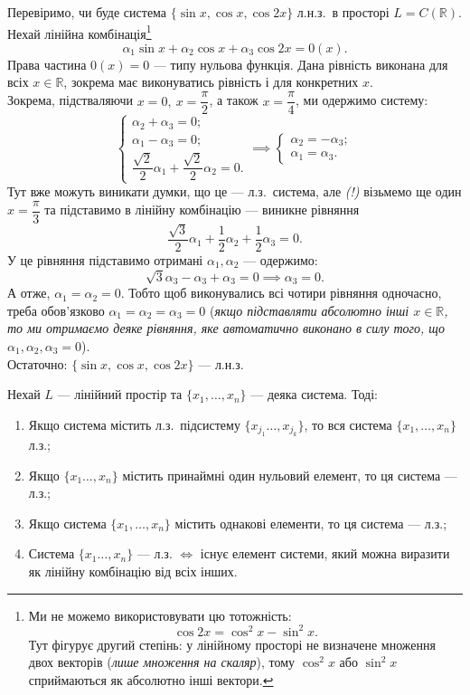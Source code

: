 \documentclass{math_library}
\begin{document}
	\begin{example}
	Перевіримо, чи буде система $\{\sin x, \cos x, \cos 2x\}$ л.н.з.\ в просторі $L = C(\mathbb{R})$.
	\bigskip \\
	Нехай лінійна комбінація\footnote{Ми не можемо використовувати цю тотожність: 
	\[
	\cos 2x = \cos ^2 x - \sin ^2 x.
	\]
	Тут фігурує другий степінь: у лінійному просторі не визначене множення двох векторів (\textit{лише множення на скаляр}), тому $\cos^2 x$ або $\sin^2 x$ сприймаються як абсолютно інші вектори.}
	\[
	\alpha_1 \sin x + \alpha_2 \cos x + \alpha_3 \cos 2x = 0(x).
	\]
	Права частина $0(x) = 0$ --- типу нульова функція. Дана рівність виконана для всіх $x \in \mathbb{R}$, зокрема має виконуватись рівність і для конкретних $x$.\\
	Зокрема, підстваляючи $x = 0,\ x = \dfrac{\pi}{2}$, а також $x = \dfrac{\pi}{4}$, ми одержимо систему:
	\[
	\begin{cases}
	\alpha_2 + \alpha_3 = 0;\\
	\alpha_1 - \alpha_3 = 0;\\
	\dfrac{\sqrt{2}}{2} \alpha_1 + \dfrac{\sqrt{2}}{2} \alpha_2 = 0.
	\end{cases}
	\implies
	\begin{cases}
	\alpha_2 =  -\alpha_3;\\
	\alpha_1 = \alpha_3.
	\end{cases}
	\]
	Тут вже можуть виникати думки, що це --- л.з.\ система, але \textit{(!)} візьмемо ще один $x = \dfrac{\pi}{3}$ та підставимо в лінійну комбінацію --- виникне рівняння
	\[
	\dfrac{\sqrt{3}}{2}\alpha_1 + \dfrac{1}{2}\alpha_2 + \dfrac{1}{2}\alpha_3 = 0.
	\]
	У це рівняння підставимо отримані $\alpha_1,\alpha_2$ --- одержимо:
	\[
	\sqrt{3}\alpha_3 - \alpha_3 + \alpha_3 = 0 \implies \alpha_3 = 0.
	\]
	А отже, $\alpha_1 = \alpha_2 = 0$. Тобто щоб виконувались всі чотири рівняння одночасно, треба обов'язково $\alpha_1 = \alpha_2 = \alpha_3 = 0$ (\textit{якщо підставляти абсолютно інші $x \in \mathbb{R}$, то ми отримаємо деяке рівняння, яке автоматично виконано в силу того, що $\alpha_1,\alpha_2,\alpha_3 = 0$}).\\
	Остаточно: $\{\sin x, \cos x, \cos 2x\}$ --- л.н.з.
	\end{example}
	
	\begin{proposition}
	Нехай $L$ --- лінійний простір та $\{x_1,\dots,x_n\}$ --- деяка система. Тоді:
	\begin{enumerate}[nosep, wide = 0pt, label={\arabic*)}]
	\item Якщо система містить л.з.\ підсистему $\{x_{j_1} \dots, x_{j_k}\}$, то вся система $\{x_1,\dots,x_n\}$ л.з.;
	\item Якщо $\{x_1 \dots, x_n\}$ містить принаймні один нульовий елемент, то ця система --- л.з.;
	\item Якщо система $\{x_1,\dots,x_n\}$ містить однакові елементи, то ця система --- л.з.;
	\item Система $\{x_1 \dots, x_n\}$ --- л.з. $\iff$ існує елемент системи, який можна виразити як лінійну комбінацію від всіх інших.
	\end{enumerate}
	\end{proposition}
	
\end{document}
